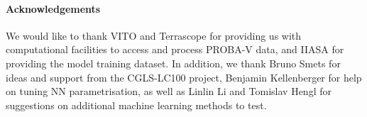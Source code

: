 \documentclass[review,authoryear,3p]{elsarticle}
\newcommand{\minisection}[1]{\paragraph{#1}}%
\begin{document}
\minisection{Acknowledgements} We would like to thank VITO and Terrascope for providing us with computational facilities to access and process {PROBA-V} data, and IIASA for providing the model training dataset. In addition, we thank Bruno Smets for ideas and support from the \gls{CGLS-LC100} project, Benjamin Kellenberger for help on tuning \gls{NN} parametrisation, as well as Linlin Li and Tomislav Hengl for suggestions on additional machine learning methods to test.






\end{document}
